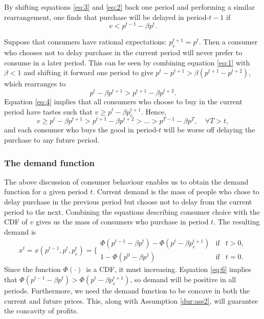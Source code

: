 By shifting equations \eqref{eq:3} and \eqref{eq:2} back one period and
performing a similar rearrangement, one finds that purchase will be delayed
in period-$t-1$ if 
\begin{equation}
v<p^{t-1}-\beta p^{t}.  \label{eq:5}
\end{equation}

Suppose that consumers have rational expectations: $p_{e}^{t+1}=p^{t}$. Then
a consumer who chooses not to delay purchase in the current period will
never prefer to consume in a later period. This can be seen by combining
equation \eqref{eq:1} with $\beta <1$ and shifting it forward one period to
give $p^{t}-p^{t+1}>\beta (p^{t+1}-p^{t+2})$, which rearranges to 
\begin{equation}
p^{t}-\beta p^{t+1}>p^{t+1}-\beta p^{t+2}.  \label{eq:6}
\end{equation}%
Equation \eqref{eq:4} implies that all consumers who choose to buy in the
current period have tastes such that $v\geq p^{t}-\beta p_{e}^{t+1}$. Hence, 
\begin{equation}
v\geq p^{t}-\beta p^{t+1}>p^{t+1}-\beta p^{t+2}>\ldots >p^{T-1}-\beta
p^{T},\quad \forall T>t,  \label{eq:7}
\end{equation}%
and each consumer who buys the good in period-$t$ will be worse off delaying
the purchase to any future period.

\subsubsection{The demand function}

\label{sec:demand-function}

The above discussion of consumer behaviour enables us to obtain the demand
function for a given period $t$. Current demand is the mass of people who
chose to delay purchase in the previous period but choose not to delay from
the current period to the next. Combining the equations describing consumer
choice with the CDF of $v$ gives us the mass of consumers who purchase in
period $t$. The resulting demand is 
\begin{equation}
x^{t}=x(p^{t-1},p^{t},p_{e}^{t})=\Biggl\{%
\begin{array}{lcl}
\Phi (p^{t-1}-\beta p^{t})-\Phi (p^{t}-\beta p_{e}^{t+1}) & \mbox{if} & t>0,
\\ 
1-\Phi (p^{0}-\beta p^{1}) & \mbox{if} & t=0.%
\end{array}
\label{eq:demand}
\end{equation}%
Since the function $\Phi (\cdot )$\ is a CDF, it must increasing. Equation %
\eqref{eq:6} implies that $\Phi (p^{t-1}-\beta p^{t})>\Phi (p^{t}-\beta
p_{e}^{t+1})$, so demand will be positive in all periods. Furthermore, we
need the demand function to be concave in both the current and future
prices. This, along with Assumption \ref{dur:ass2}, will guarantee the
concavity of profits.

